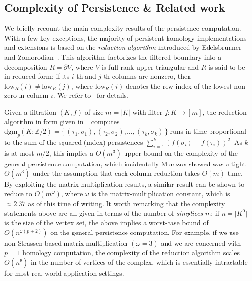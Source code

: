 \documentclass[10pt]{article}
\numberwithin{equation}{section}
\newcommand{\+}{%
	\raisebox{0.18ex}{\scaleobj{0.55}{+}}
}
\theoremstyle{definition}
\theoremstyle{definition}
\begin{document}


\subsection{Complexity of Persistence \& Related work}
We briefly recount the main complexity results of the persistence computation. 
With a few key exceptions, the majority of persistent homology implementations and extensions is based on the \emph{reduction algorithm} introduced by Edelsbrunner and Zomorodian~\cite{edelsbrunner2000topological}. 
This algorithm factorizes the filtered boundary into a decomposition $R = \partial V$, where $V$ is full rank upper-triangular and $R$ is said to be in reduced form: if its $i$-th and $j$-th columns are nonzero, then $\mathrm{low}_R(i) \neq \mathrm{low}_R(j)$, where $\mathrm{low}_R(i)$ denotes the row index of the lowest non-zero in column $i$. 
We refer to~\cite{edelsbrunner2000topological, bauer2020persistence, dey2022computational} for details. 

Given a filtration $(K, f)$ of size $m = \lvert K \rvert$ with filter $f : K \to [m]$, the reduction algorithm in form given in ~\cite{edelsbrunner2000topological} computes $\mathrm{dgm}_p(K; \mathbb{Z}/2) = \{ \, (\tau_1, \sigma_1), (\tau_2, \sigma_2), \dots, (\tau_k, \sigma_k) \, \}$ runs in time proportional to the sum of the squared (index) persistences $\sum_{i=1}^k (f(\sigma_i)-f(\tau_i))^2$. As $k$ is at most $m / 2$, this implies a $O(m^3)$ upper bound on the complexity of the general persistence computation, which incidentally Morozov showed was a tight $\Theta(m^3)$ under the assumption that each column reduction takes $O(m)$ time. 
By exploiting the matrix-multiplication results, a similar result can be shown to reduce to $O(m^\omega)$, where $\omega$ is the matrix-multiplication constant, which is $\approx 2.37$ as of this time of writing. 
It worth remarking that the complexity statements above are all given in terms of the number of \emph{simplices} $m$: if $n = \lvert K^0 \rvert$ is the size of the vertex set, the above implies a worst-case bound of $O(n^{\omega(p+2)})$ on the general persistence computation. For example, if we use non-Strassen-based matrix multiplication $(\omega = 3)$ and we are concerned with $p=1$ homology computation, the complexity of the reduction algorithm scales $O(n^9)$ in the number of vertices of the complex, which is essentially intractable for most real world application settings. 
\end{document}
